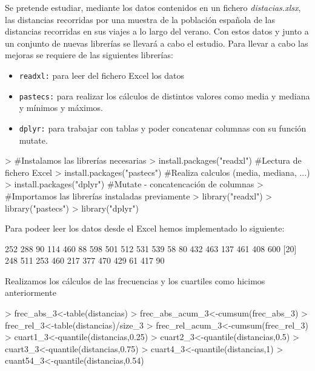 \documentclass[a4paper]{article}
\begin{document}
Se pretende estudiar, mediante los datos contenidos en un fichero \textit{distacias.xlsx}, las distancias recorridas por una muestra de la población española de las distancias recorridas en sus viajes a lo largo del verano. Con estos datos y junto a un conjunto de nuevas librerías se llevará a cabo el estudio.
Para llevar a cabo las mejoras se requiere de las siguientes librerías:
\begin{itemize}
     \item \texttt{readxl:} para leer del fichero Excel los datos
     \item \texttt{pastecs:} para realizar los cálculos de distintos valores como media y mediana y mínimos y máximos.
     \item \texttt{dplyr:} para trabajar con tablas y poder concatenar columnas con su función mutate.
\end{itemize}

\begin{Schunk}
\begin{Sinput}
> #Instalamos las librerías necesarias
> install.packages("readxl")  #Lectura de fichero Excel
> install.packages("pastecs") #Realiza calculos (media, mediana, ...)
> install.packages("dplyr")   #Mutate - concatencación de columnas
> #Importamos las librerías instaladas previamente
> library("readxl") 
> library("pastecs")
> library("dplyr")
\end{Sinput}
\end{Schunk}

Para podeer leer los datos desde el Excel hemos implementado lo siguiente:
\begin{Schunk}
\begin{Soutput}
 [1] 252 288  90 114 460  88 598 501 512 531 539  58  80 432 463 137 461 408 600
[20] 248 511 253 460 217 377 470 429  61 417  90
\end{Soutput}
\end{Schunk}

Realizamos los cálculos de las frecuencias y los cuartiles como hicimos anteriormente
\begin{Schunk}
\begin{Sinput}
> frec_abs_3<-table(distancias)
> frec_abs_acum_3<-cumsum(frec_abs_3)
> frec_rel_3<-table(distancias)/size_3
> frec_rel_acum_3<-cumsum(frec_rel_3)
> cuart1_3<-quantile(distancias,0.25)
> cuart2_3<-quantile(distancias,0.5)
> cuart3_3<-quantile(distancias,0.75)
> cuart4_3<-quantile(distancias,1)
> cuant54_3<-quantile(distancias,0.54)
\end{Sinput}
\end{Schunk}
\end{document}
